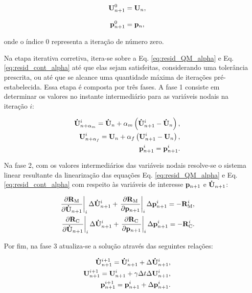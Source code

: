 \documentclass[tese_patricia]{subfiles}%
\begin{document}
\begin{align}
\mathbf{U}_{n+1}^{0} = \mathbf{U}_{n}, \label{eq:pred_vel}
\end{align}

\begin{align}
\mathbf{p}_{n+1}^{0} = \mathbf{p}_{n},\label{eq:pred_press}
\end{align}

\noindent onde o índice $0$ representa a iteração de número zero. 

Na etapa iterativa corretiva, itera-se sobre a Eq. \eqref{eq:resid_QM_alpha} e Eq. \eqref{eq:resid_cont_alpha} até que elas sejam satisfeitas, considerando uma tolerância prescrita, ou até que se alcance uma quantidade máxima de iterações pré-estabelecida. Essa etapa é composta por três fases. A fase 1 consiste em determinar os valores no instante intermediário para as variáveis nodais na iteração $i$:

\begin{align}
\mathbf{\dot{U}}_{n+\alpha_m}^{i} = \mathbf{\dot{U}}_n + \alpha_m \left( \mathbf{\dot{U}}_{n+1}^{i} - \mathbf{\dot{U}}_n \right), \label{eq:inter_acel_i}\\
\mathbf{U}_{n+\alpha_f}^{i} = \mathbf{U}_n + \alpha_f \left( \mathbf{U}_{n+1}^{i} - \mathbf{U}_n \right), \label{eq:inter_vel_i}\\
\mathbf{p}_{n+1}^{i} = \mathbf{p}_{n+1}^{i} \label{eq:inter_press_i}.
\end{align}

Na fase 2, com os valores intermediários das variáveis nodais resolve-se o sistema linear resultante da linearização das equações Eq. \eqref{eq:resid_QM_alpha} e Eq. \eqref{eq:resid_cont_alpha} com respeito às variáveis de interesse $\mathbf{p}_{n+1}$ e $\mathbf{\dot{U}}_{n+1}$:

\begin{align}
\left .\frac{\partial\mathbf{R}_\mathrm{M}}{\partial\mathbf{\dot{U}}_{n+1}}\right|_{i} \Delta \mathbf{\dot{U}}_{n+1}^{i} + \left .\frac{\partial\mathbf{R}_\mathrm{M}}{\partial\mathbf{p}_{n+1}}\right|_{i} \Delta \mathbf{p}_{n+1}^{i} = -\mathbf{R}_\mathrm{M}^{i}, \label{eq:eq_lin_QM} \\
\left .\frac{\partial\mathbf{R}_\mathrm{C}}{\partial\mathbf{\dot{U}}_{n+1}}\right|_{i} \Delta \mathbf{\dot{U}}_{n+1}^{i} + \left .\frac{\partial\mathbf{R}_\mathrm{C}}{\partial\mathbf{p}_{n+1}}\right|_{i} \Delta \mathbf{p}_{n+1}^{i} = -\mathbf{R}_\mathrm{C}^{i}.\label{eq:eq_lin_cont}
\end{align}

Por fim, na fase 3 atualiza-se a solução através das seguintes relações:

\begin{align}
\mathbf{\dot{U}}_{n+1}^{i+1} = \mathbf{\dot{U}}_{n+1}^{i} + \Delta\mathbf{\dot{U}}_{n+1}^{i},\label{atu_acel} \\ 
\mathbf{U}_{n+1}^{i+1} = \mathbf{U}_{n+1}^{i} + \gamma \Delta t \Delta\mathbf{U}_{n+1}^{i},\label{atu_vel}\\
\mathbf{p}_{n+1}^{i+1} = \mathbf{p}_{n+1}^{i} + \Delta\mathbf{p}_{n+1}^{i}.\label{atu_press}
\end{align}
\end{document}
